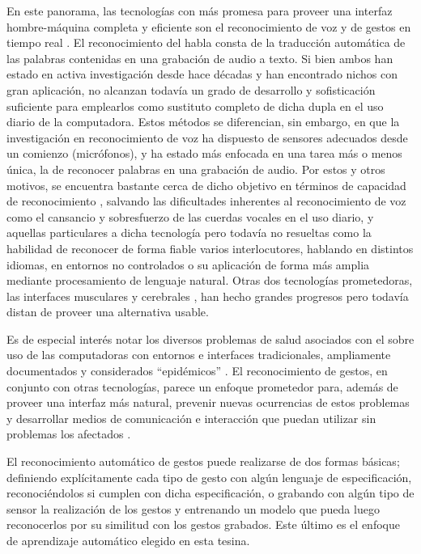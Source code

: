 En este panorama, las tecnologías con más promesa para proveer una interfaz hombre-máquina completa y eficiente son el reconocimiento de voz y de gestos en tiempo real \cite{Jain2011}. El reconocimiento del habla consta de la traducción automática de las palabras contenidas en una grabación de audio a texto. Si bien ambos han estado en activa investigación desde hace décadas \cite{madeira1978,myers1998,juang2005} y han encontrado nichos con gran aplicación, no alcanzan todavía un grado de desarrollo y sofisticación suficiente para emplearlos como sustituto completo de dicha dupla en el uso diario de la computadora. Estos métodos se diferencian, sin embargo, en que la investigación en reconocimiento de voz ha dispuesto de sensores adecuados desde un comienzo (micrófonos), y ha estado más enfocada en una tarea más o menos única, la de reconocer palabras en una grabación de audio. Por estos y otros motivos, se encuentra bastante cerca de dicho objetivo en términos de capacidad de reconocimiento \cite{anusuya2010,schalkwyk2010,hinton2012}, salvando las dificultades inherentes al reconocimiento de voz como el cansancio y sobresfuerzo de las cuerdas vocales en el uso diario, y aquellas particulares a dicha tecnología pero todavía no resueltas como la habilidad de reconocer de forma fiable varios interlocutores, hablando en distintos idiomas, en entornos no controlados \cite{Rashmi2013,heigold2013} o su aplicación de forma más amplia \cite{deng2004} mediante procesamiento de lenguaje natural. Otras dos tecnologías prometedoras, las interfaces musculares \cite{chowdhury2013} y cerebrales \cite{lebedev2006,millan2013}, han hecho grandes progresos pero todavía distan de proveer una alternativa usable.

Es de especial interés notar los diversos problemas de salud asociados con el sobre uso de las computadoras con entornos e interfaces tradicionales, ampliamente documentados y considerados ``epidémicos'' \cite{kiesler1988,keller1998,epstein2012,saroshe2012,Coggon2013}. El reconocimiento de gestos, en conjunto con otras tecnologías, parece un enfoque prometedor para, además de proveer una interfaz más natural, prevenir nuevas ocurrencias de estos problemas y desarrollar medios de comunicación e interacción que puedan utilizar sin problemas los afectados \cite{chen2009,Perera2005}. 

El reconocimiento automático de gestos puede realizarse de dos formas básicas; definiendo explícitamente cada tipo de gesto con algún lenguaje de especificación, reconociéndolos si cumplen con dicha especificación, o grabando con algún tipo de sensor la realización de los gestos y entrenando un modelo que pueda luego reconocerlos por su similitud con los gestos grabados. Este último es el enfoque de aprendizaje automático elegido en esta tesina.

